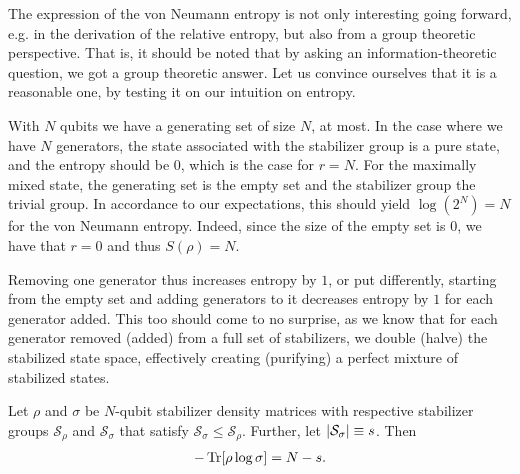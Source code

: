 The expression of the von Neumann entropy is not only interesting going
forward, e.g. in the derivation of the relative entropy, but also from a group
theoretic perspective. That is, it should be noted that by asking an
information-theoretic question, we got a group theoretic answer. Let us
convince ourselves that it is a reasonable one, by testing it on our intuition
on entropy.

With $N$ qubits we have a generating set of size $N$, at most. In the case
where we have $N$ generators, the state associated with the stabilizer group is
a pure state, and the entropy should be $0$, which is the case for $r=N$. For
the maximally mixed state, the generating set is the empty set and the
stabilizer group the trivial group. In accordance to our expectations, this
should yield $\log(2^N)= N$ for the von Neumann entropy. Indeed, since the size of
the empty set is $0$, we have that $r=0$ and thus $S(\rho) = N$.

Removing one generator thus increases entropy by $1$, or put differently,
starting from the empty set and adding generators to it decreases entropy by
$1$ for each generator added. This too should come to no surprise, as we know
that for each generator removed (added) from a full set of stabilizers, we
double (halve) the stabilized state space, effectively creating (purifying) a
perfect mixture of stabilized states.

\begin{thm}\label{thm:cross-ent-stab}
  Let $\rho$ and $\sigma$ be $N$-qubit stabilizer density matrices with
  respective stabilizer groups $\mathcal{S}_\rho$ and $\mathcal{S}_\sigma$ that
  satisfy $\mathcal{S}_\sigma \leq
  \mathcal{S}_\rho$. Further, let $\abs{\mathcal{S}_\sigma} \equiv s$. Then
  \begin{align}\label{eq:cross-ent-stab}
    -\Tr[\rho\log\sigma] = N - s
  .\end{align}
\end{thm}

